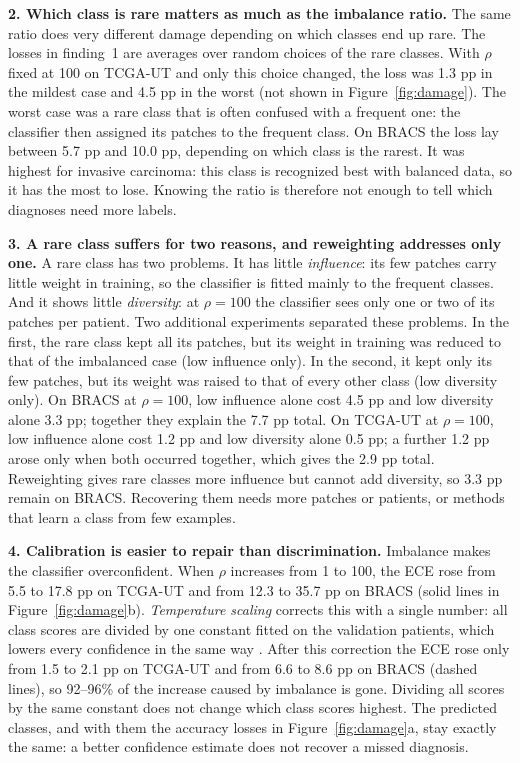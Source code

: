 \documentclass[11pt,a4paper]{article}
\begin{document}
\smallskip\noindent\textbf{2. Which class is rare matters as much as the imbalance ratio.}
The same ratio does very different damage depending on which classes end up rare.
The losses in finding~1 are averages over random choices of the rare classes.
With $\rho$ fixed at 100 on TCGA-UT and only this choice changed, the loss was 1.3 pp in the mildest case and 4.5 pp in the worst (not shown in Figure~\ref{fig:damage}).
The worst case was a rare class that is often confused with a frequent one: the classifier then assigned its patches to the frequent class.
On BRACS the loss lay between 5.7 pp and 10.0 pp, depending on which class is the rarest.
It was highest for invasive carcinoma: this class is recognized best with balanced data, so it has the most to lose.
Knowing the ratio is therefore not enough to tell which diagnoses need more labels.

\smallskip\noindent\textbf{3. A rare class suffers for two reasons, and reweighting addresses only one.}
A rare class has two problems.
It has little \emph{influence}: its few patches carry little weight in training, so the classifier is fitted mainly to the frequent classes.
And it shows little \emph{diversity}: at $\rho=100$ the classifier sees only one or two of its patches per patient.
Two additional experiments separated these problems.
In the first, the rare class kept all its patches, but its weight in training was reduced to that of the imbalanced case (low influence only).
In the second, it kept only its few patches, but its weight was raised to that of every other class (low diversity only).
On BRACS at $\rho=100$, low influence alone cost 4.5 pp and low diversity alone 3.3 pp; together they explain the 7.7 pp total.
On TCGA-UT at $\rho=100$, low influence alone cost 1.2 pp and low diversity alone 0.5 pp; a further 1.2 pp arose only when both occurred together, which gives the 2.9 pp total.
Reweighting gives rare classes more influence but cannot add diversity, so 3.3 pp remain on BRACS.
Recovering them needs more patches or patients, or methods that learn a class from few examples.

\smallskip\noindent\textbf{4. Calibration is easier to repair than discrimination.}
Imbalance makes the classifier overconfident.
When $\rho$ increases from 1 to 100, the ECE rose from 5.5 to 17.8 pp on TCGA-UT and from 12.3 to 35.7 pp on BRACS (solid lines in Figure~\ref{fig:damage}b).
\emph{Temperature scaling} corrects this with a single number: all class scores are divided by one constant fitted on the validation patients, which lowers every confidence in the same way \citep{guo2017calibration}.
After this correction the ECE rose only from 1.5 to 2.1 pp on TCGA-UT and from 6.6 to 8.6 pp on BRACS (dashed lines), so 92--96\% of the increase caused by imbalance is gone.
Dividing all scores by the same constant does not change which class scores highest.
The predicted classes, and with them the accuracy losses in Figure~\ref{fig:damage}a, stay exactly the same: a better confidence estimate does not recover a missed diagnosis.
\end{document}
